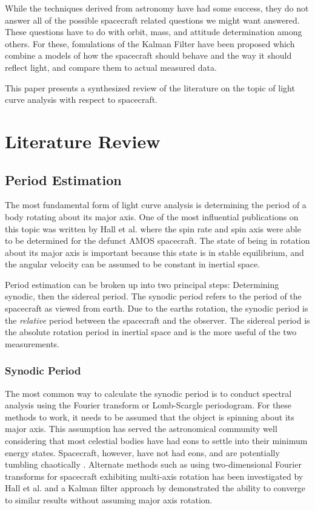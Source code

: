 \documentclass{article}
\begin{document}
While the techniques derived from astronomy have had some success, they do not answer all of the possible spacecraft related questions we might want answered. These questions have to do with orbit, mass, and attitude determination among others. For these, fomulations of the Kalman Filter have been proposed which combine a models of how the spacecraft should behave and the way it should reflect light, and compare them to actual measured data. 

This paper presents a synthesized review of the literature on the topic of light curve analysis with respect to spacecraft.

\section{Literature Review}

\subsection{Period Estimation}

The most fundamental form of light curve analysis is determining the period of a body rotating about its major axis. One of the most influential publications on this topic was written by Hall et al.\cite{AMOS} where the spin rate and spin axis were able to be determined for the defunct AMOS spacecraft. The state of being in rotation about its major axis is important because this state is in stable equilibrium, and the angular velocity can be assumed to be constant in inertial space. 

Period estimation can be broken up into two principal steps: Determining synodic, then the sidereal period. The synodic period refers to the period of the spacecraft as viewed from earth. Due to the earths rotation, the synodic period is the \textit{relative} period between the spacecraft and the observer. The sidereal period is the absolute rotation period in inertial space and is the more useful of the two measurements. 

\subsubsection{Synodic Period}

The most common way to calculate the synodic period is to conduct spectral analysis using the Fourier transform or Lomb-Scargle periodogram. For these methods to work, it needs to be assumed that the object is spinning about its major axis. This assumption has served the astronomical community well considering that most celestial bodies have had eons to settle into their minimum energy states. Spacecraft, however, have not had eons, and are potentially tumbling chaotically \cite{AMOS}. Alternate methods such as using two-dimensional Fourier transforms for spacecraft exhibiting multi-axis rotation has been investigated by Hall et al. \cite{Hall2014OpticalCO} and a Kalman filter approach by \cite{AttitudeEstimationFromLightCurve} demonstrated the ability to converge to similar results without assuming major axis rotation.
\end{document}
